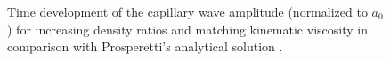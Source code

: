 \begin{figure}[t]
\centering
   \caption{Time development of the capillary wave amplitude (normalized to $a_0$) for increasing density ratios and matching kinematic viscosity in comparison with Prosperetti's analytical solution \citep{Prosperetti_1981}.}
   \label{fig:cap_wave}
\end{figure}


